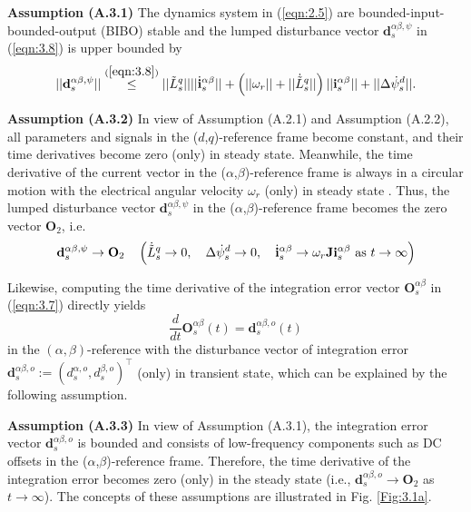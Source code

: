 \textbf{Assumption (A.3.1)} The dynamics system in (\ref{eqn:2.5}) are bounded-input-bounded-output (BIBO) stable and the lumped disturbance vector $\mathbf{d}^{\alpha\beta,\psi}_{s}$ in (\ref{eqn:3.8}) is upper bounded by
\begin{equation}\notag
   ||\mathbf{d}^{\alpha\beta,\psi}_{s} || \stackrel{(\ref{eqn:3.8})}\leq  ||\tilde{L}^q_s|| ||\dot{\mathbf{ i}}^{\alpha\beta}_s ||+\left(||\omega_r|| +||\dot{\tilde{L}}^q_s|| \right) ||\mathbf{i}^{\alpha\beta}_s|| + ||\Delta \dot\psi^{ d}_s||.
\end{equation}

\textbf{Assumption (A.3.2)} In view of Assumption (A.2.1) and Assumption (A.2.2), all parameters and signals in the ($d$,$q$)-reference frame become constant, and their time derivatives become zero (only) in steady state. Meanwhile, the time derivative of the current vector in the ($\alpha$,$\beta$)-reference frame is always in a circular motion with the electrical angular velocity $\omega_r$ (only) in steady state \cite{c3.2_7}. Thus, the lumped disturbance vector $\mathbf{d}^{\alpha\beta,\psi}_{s} $ in the ($\alpha$,$\beta$)-reference frame becomes the zero vector \(\mathbf{O}_2\), i.e.
\begin{align}\notag
    \mathbf{d}^{\alpha\beta,\psi}_s \rightarrow \mathbf{O}_2 \quad \left(\dot{\tilde{L}}^q_s \rightarrow 0, \quad \Delta\dot{\psi}^d_s \rightarrow 0, \quad \dot{\mathbf{i}}^{\alpha\beta}_s \rightarrow \omega_r \mathbf{J} \mathbf{i}^{\alpha\beta}_s \text{ as } t \rightarrow \infty \right)
\end{align}

Likewise, computing the time derivative of the integration error vector $\mathbf{O}^{\alpha\beta}_s$ in (\ref{eqn:3.7}) directly yields
\begin{equation}\label{eqn:3.9}
\frac{d}{dt}{\mathbf{O}}^{\alpha\beta}_s(t) = \mathbf{d}^{\alpha\beta,o}_{s}(t)
\end{equation}
in the $(\alpha,\beta)$-reference with the disturbance vector of integration error $\mathbf{d}^{\alpha\beta,o}_{s} := (d^{\alpha,o}_{s}, d^{\beta,o}_{s})^\top$ (only) in transient state, which can be explained by the following assumption.

\textbf{Assumption (A.3.3)} In view of Assumption (A.3.1), the integration error vector ${\mathbf{d}}^{\alpha\beta,o}_s$ is bounded and consists of low-frequency components such as DC offsets in the ($\alpha$,$\beta$)-reference frame. Therefore, the time derivative of the integration error becomes zero (only) in the steady state (i.e., $\mathbf{d}^{\alpha\beta,o}_s \rightarrow \mathbf{O}_2$ as $t \rightarrow \infty$). The concepts of these assumptions are illustrated in Fig. \ref{Fig:3.1a}. 

